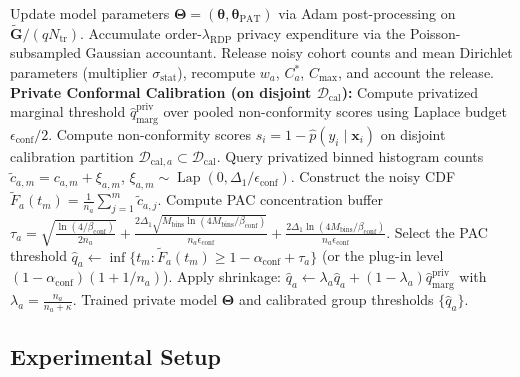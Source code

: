 \documentclass[pdflatex,sn-vancouver-num,referee,lineno]{sn-jnl}
\theoremstyle{thmstyleone}
\theoremstyle{thmstylethree}
\begin{document}
\begin{algorithm}[t]
\begin{algorithmic}[1]
        \STATE Update model parameters $\boldsymbol{\Theta} = (\boldsymbol{\theta}, \boldsymbol{\theta}_{\text{PAT}})$ via Adam post-processing on $\tilde{\mathbf{G}} / (q N_{\text{tr}})$.
        \STATE Accumulate order-$\lambda_{\text{RDP}}$ privacy expenditure via the Poisson-subsampled Gaussian accountant.
    \ENDFOR
        \STATE Release noisy cohort counts and mean Dirichlet parameters (multiplier $\sigma_{\text{stat}}$), recompute $w_a$, $C_a^*$, $C_{\max}$, and account the release.
    \ENDIF
\ENDFOR
\STATE \textbf{Private Conformal Calibration (on disjoint $\mathcal{D}_{\text{cal}}$):}
\STATE Compute privatized marginal threshold $\hat{q}_{\text{marg}}^{\text{priv}}$ over pooled non-conformity scores using Laplace budget $\epsilon_{\text{conf}}/2$.
    \STATE Compute non-conformity scores $s_i = 1 - \hat{p}(y_i \mid \mathbf{x}_i)$ on disjoint calibration partition $\mathcal{D}_{\text{cal}, a} \subset \mathcal{D}_{\text{cal}}$.
    \STATE Query privatized binned histogram counts $\tilde{c}_{a, m} = c_{a, m} + \xi_{a, m}$, $\xi_{a, m} \sim \operatorname{Lap}(0, \Delta_1/\epsilon_{\text{conf}})$.
    \STATE Construct the noisy CDF $\widetilde{F}_a(t_m) = \frac{1}{n_a}\sum_{j=1}^m \tilde{c}_{a, j}$.
    \STATE Compute PAC concentration buffer $\tau_a = \sqrt{\frac{\ln(4/\beta_{\text{conf}})}{2 n_a}} + \frac{2 \Delta_1 \sqrt{M_{\text{bins}} \ln(4M_{\text{bins}}/\beta_{\text{conf}})}}{n_a \epsilon_{\text{conf}}} + \frac{2 \Delta_1 \ln(4M_{\text{bins}}/\beta_{\text{conf}})}{n_a \epsilon_{\text{conf}}}$.
    \STATE Select the PAC threshold $\hat{q}_a \leftarrow \inf \{t_m : \widetilde{F}_a(t_m) \ge 1 - \alpha_{\text{conf}} + \tau_a\}$ (or the plug-in level $(1-\alpha_{\text{conf}})(1+1/n_a)$).
    \STATE Apply shrinkage: $\hat{q}_a \leftarrow \lambda_a \hat{q}_a + (1 - \lambda_a) \hat{q}_{\text{marg}}^{\text{priv}}$ with $\lambda_a = \frac{n_a}{n_a + \kappa}$.
\ENDFOR
\RETURN Trained private model $\boldsymbol{\Theta}$ and calibrated group thresholds $\{\hat{q}_a\}$.
\end{algorithmic}
\end{algorithm}

\subsection{Experimental Setup}
\label{sec:experiments}
\end{document}

